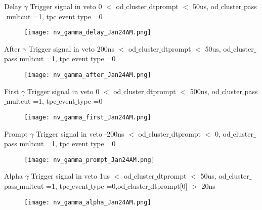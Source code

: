 \documentclass[9pt]{beamer}
\begin{document}
\begin{frame}{Delay $\gamma$ Trigger signal in veto}
0 $<$ od$\_$cluster$\_$dtprompt $<$ 50us, od$\_$cluster$\_$pass$\_$multcut =1,  tpc$\_$event$\_$type =0

\begin{figure}
\texttt{[image: nv\_gamma\_delay\_Jan24AM.png]}
\end{figure}
\end{frame}

\begin{frame}{After $\gamma$ Trigger signal in veto}
200ns $<$ od$\_$cluster$\_$dtprompt $<$ 50us, od$\_$cluster$\_$pass$\_$multcut =1,  tpc$\_$event$\_$type =0

\begin{figure}
\texttt{[image: nv\_gamma\_after\_Jan24AM.png]}
\end{figure}
\end{frame}

\begin{frame}{First $\gamma$ Trigger signal in veto}
0 $<$ od$\_$cluster$\_$dtprompt $<$ 500ns, od$\_$cluster$\_$pass$\_$multcut =1,  tpc$\_$event$\_$type =0

\begin{figure}
\texttt{[image: nv\_gamma\_first\_Jan24AM.png]}
\end{figure}
\end{frame}

\begin{frame}{Prompt $\gamma$ Trigger signal in veto}
-200ns $<$ od$\_$cluster$\_$dtprompt $<$ 0, od$\_$cluster$\_$pass$\_$multcut =1,  tpc$\_$event$\_$type =0

\begin{figure}
\texttt{[image: nv\_gamma\_prompt\_Jan24AM.png]}
\end{figure}
\end{frame}

\begin{frame}{Alpha $\gamma$ Trigger signal in veto}
1us $<$ od$\_$cluster$\_$dtprompt $<$ 50us, od$\_$cluster$\_$pass$\_$multcut =1,  tpc$\_$event$\_$type =0,od$\_$cluster$\_$dtprompt[0] $>$ 20ns

\begin{figure}
\texttt{[image: nv\_gamma\_alpha\_Jan24AM.png]}
\end{figure}
\end{frame}
\end{document}
